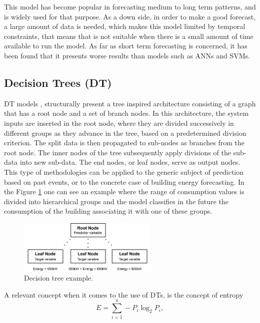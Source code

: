 This model has become popular in forecasting medium to long term patterns, and is widely used for that purpose. As a down side, in order to make a good forecast, a large amount of data is needed, which makes this model limited by temporal constraints, that means that is not suitable when there is a small amount of time available to run the model. As far as short term forecasting is concerned, it has been found that it presents worse results than models such as \ac{ANNs} and \ac{SVM}s.

\subsection{Decision Trees (DT)}

\ac{DT} models \cite{dt1}, structurally present a tree inspired architecture consisting of a graph that has a root node and a set of branch nodes. In this architecture, the system inputs are inserted in the root node, where they are divided successively in different groups as they advance in the tree, based on a predetermined division criterion. The split data is then propagated to sub-nodes as branches from the root node. The inner nodes of the tree subsequently apply divisions of the sub-data into new sub-data. The end nodes, or leaf nodes, serve as output nodes. This type of methodologies can be applied to the generic subject of prediction based on past events, or to the concrete case of building energy forecasting. In the Figure \ref{dt} one can see an example where the range of consumption values is divided into hierarchical groups and the model classifies in the future the consumption of the building associating it with one of these groups.


\begin{figure}[h!]
    \centering
    \begin{center}
    \includegraphics[width=0.6\textwidth]{Images/DT.png}
    \caption{Decision tree example.}
    \label{dt}
    \end{center}
\end{figure}

A relevant concept when it comes to the use of \ac{DT}s, is the concept of entropy
\begin{equation}
       E=\sum_{i=1}^n -P_i\log_2P_i,
\label{entropy}
\end{equation}

